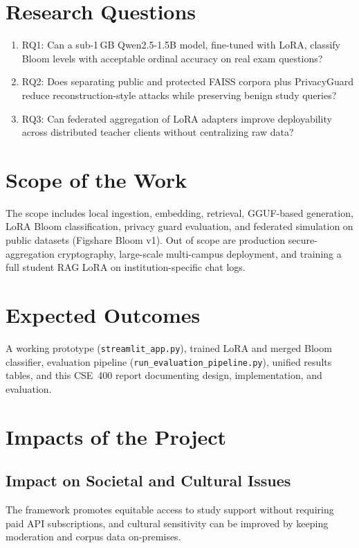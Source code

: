 \section{Research Questions}
\begin{enumerate}
    \item RQ1: Can a sub-1\,GB Qwen2.5-1.5B model, fine-tuned with LoRA, classify Bloom levels with acceptable ordinal accuracy on real exam questions?
    \item RQ2: Does separating public and protected FAISS corpora plus PrivacyGuard reduce reconstruction-style attacks while preserving benign study queries?
    \item RQ3: Can federated aggregation of LoRA adapters improve deployability across distributed teacher clients without centralizing raw data?
\end{enumerate}

\section{Scope of the Work}
The scope includes local ingestion, embedding, retrieval, GGUF-based generation, LoRA Bloom classification, privacy guard evaluation, and federated simulation on public datasets (Figshare Bloom v1). Out of scope are production secure-aggregation cryptography, large-scale multi-campus deployment, and training a full student RAG LoRA on institution-specific chat logs.

\section{Expected Outcomes}
A working prototype (\texttt{streamlit\_app.py}), trained LoRA and merged Bloom classifier, evaluation pipeline (\texttt{run\_evaluation\_pipeline.py}), unified results tables, and this CSE~400 report documenting design, implementation, and evaluation.

\section{Impacts of the Project}
\subsection{Impact on Societal and Cultural Issues}
The framework promotes equitable access to study support without requiring paid API subscriptions, and cultural sensitivity can be improved by keeping moderation and corpus data on-premises.

